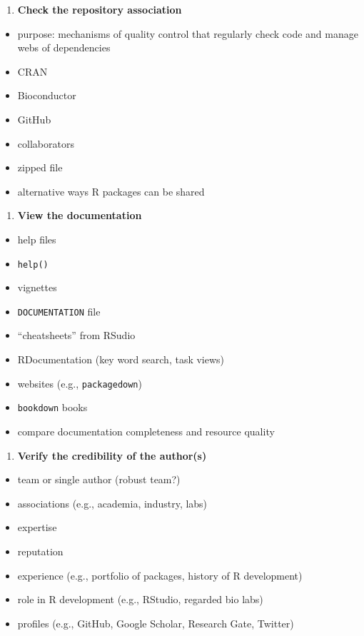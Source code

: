\documentclass[10pt,letterpaper]{article}
\providecommand{\tightlist}{%
  \setlength{\itemsep}{0pt}\setlength{\parskip}{0pt}}
\begin{document}
\begin{enumerate}
\def\labelenumi{\arabic{enumi}.}
\setcounter{enumi}{2}
\tightlist
\item
  \textbf{Check the repository association}
\end{enumerate}

\begin{itemize}
\tightlist
\item
  purpose: mechanisms of quality control that regularly check code and
  manage webs of dependencies
\item
  CRAN
\item
  Bioconductor
\item
  GitHub
\item
  collaborators
\item
  zipped file
\item
  alternative ways R packages can be shared
\end{itemize}

\begin{enumerate}
\def\labelenumi{\arabic{enumi}.}
\setcounter{enumi}{3}
\tightlist
\item
  \textbf{View the documentation}
\end{enumerate}

\begin{itemize}
\tightlist
\item
  help files
\item
  \texttt{help()}
\item
  vignettes
\item
  \texttt{DOCUMENTATION} file
\item
  ``cheatsheets'' from RSudio
\item
  RDocumentation (key word search, task views)
\item
  websites (e.g., \texttt{packagedown})
\item
  \texttt{bookdown} books
\item
  compare documentation completeness and resource quality
\end{itemize}

\begin{enumerate}
\def\labelenumi{\arabic{enumi}.}
\setcounter{enumi}{4}
\tightlist
\item
  \textbf{Verify the credibility of the author(s)}
\end{enumerate}

\begin{itemize}
\tightlist
\item
  team or single author (robust team?)
\item
  associations (e.g., academia, industry, labs)
\item
  expertise
\item
  reputation
\item
  experience (e.g., portfolio of packages, history of R development)
\item
  role in R development (e.g., RStudio, regarded bio labs)
\item
  profiles (e.g., GitHub, Google Scholar, Research Gate, Twitter)
\end{itemize}
\end{document}
